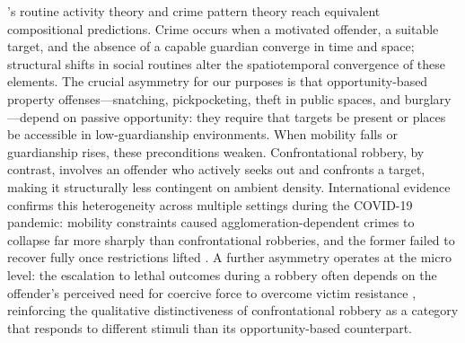 \documentclass[pdflatex,sn-basic]{sn-jnl}
\begin{document}
\citet{cohen1979}'s routine activity theory and crime pattern theory \citep{brantingham1984} reach equivalent compositional predictions. Crime occurs when a motivated offender, a suitable target, and the absence of a capable guardian converge in time and space; structural shifts in social routines alter the spatiotemporal convergence of these elements. The crucial asymmetry for our purposes is that opportunity-based property offenses---snatching, pickpocketing, theft in public spaces, and burglary---depend on passive opportunity: they require that targets be present or places be accessible in low-guardianship environments. When mobility falls or guardianship rises, these preconditions weaken. Confrontational robbery, by contrast, involves an offender who actively seeks out and confronts a target, making it structurally less contingent on ambient density. International evidence confirms this heterogeneity across multiple settings during the COVID-19 pandemic: mobility constraints caused agglomeration-dependent crimes to collapse far more sharply than confrontational robberies, and the former failed to recover fully once restrictions lifted \citep{nivette2021,ashby2020,halford2020,meyer2022,stickle2020,seyidoglu2024,zheng2025,regalado2022}. A further asymmetry operates at the micro level: the escalation to lethal outcomes during a robbery often depends on the offender's perceived need for coercive force to overcome victim resistance \citep{bowman2024}, reinforcing the qualitative distinctiveness of confrontational robbery as a category that responds to different stimuli than its opportunity-based counterpart.
\end{document}
